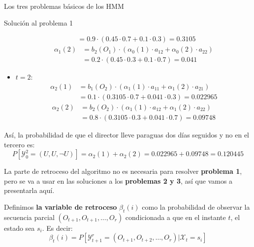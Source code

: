 \begin{section}{Los tres problemas básicos de los HMM}
\begin{subsection}{Solución al problema 1}
\begin{exampleth}
\begin{itemize}
\[\begin{aligned}
        &=0.9\cdot\left( 0.45\cdot0.7+0.1\cdot0.3 \right) = 0.3105
    \end{aligned}
    \]
    \[
    \begin{aligned}
        \alpha_1(2)&=b_2(O_1)\cdot\left(\alpha_0(1)\cdot a_{12}+\alpha_0(2)\cdot a_{22} \right)\\
        &=0.2\cdot\left(0.45\cdot0.3+0.1\cdot0.7\right)=0.041
    \end{aligned}
    \]
    \item $t=2$:
    \[
    \begin{aligned}
        \alpha_2(1)&=b_1(O_2)\cdot\left(\alpha_1(1)\cdot a_{11}+\alpha_1(2)\cdot a_{21} \right)\\
        &=0.1\cdot\left( 0.3105\cdot0.7+0.041\cdot0.3 \right) = 0.022965
    \end{aligned}
    \]
    \[
    \begin{aligned}
        \alpha_2(2)&=b_2(O_2)\cdot\left(\alpha_1(1)\cdot a_{12}+\alpha_1(2)\cdot a_{22} \right)\\
        &=0.8\cdot\left(0.3105\cdot0.3+0.041\cdot0.7\right)=0.09748
    \end{aligned}
    \]
\end{itemize}
Así, la probabilidad de que el director lleve paraguas dos días seguidos y no en el tercero es:
\[P[\mathcal{Y}_0^2=(U,U,\neg U)]=\alpha_2(1)+\alpha_2(2)=0.022965+0.09748=0.120445\]
\end{exampleth}

La parte de retroceso del algoritmo no es necesaria para resolver \textbf{problema 1}, pero se va a usar en las soluciones a los \textbf{problemas 2 y 3}, así que vamos a presentarla aquí. 

\begin{definition}
Definimos \textbf{la variable de retroceso} $\beta_t(i)$ como la probabilidad de observar la secuencia parcial $(O_{t+1},O_{t+1},\dots,O_{r})$ condicionada a que en el instante $t$, el estado sea $s_i$. Es decir:
\[\beta_t(i)=P[\mathcal{Y}_{t+1}^r=(O_{t+1},O_{t+2},\dots,O_{r})|\mathcal{X}_t=s_i]\]
\end{definition}


\end{subsection}
\end{section}
